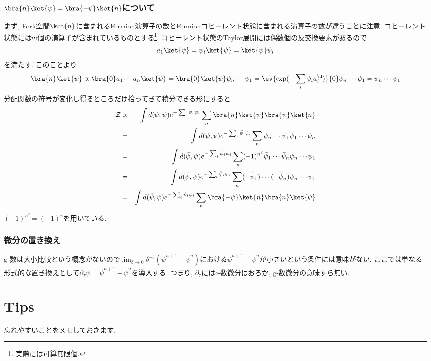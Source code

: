 \documentclass[10.5pt,a4paper]{jreport}
\begin{document}
\subsubsection{$\bra{n}\ket{\psi}=\bra{-\psi}\ket{n}$について}
まず, Fock空間$\ket{n}$に含まれるFermion演算子の数とFermionコヒーレント状態に含まれる演算子の数が違うことに注意. コヒーレント状態には$m$個の演算子が含まれているものとする\footnote{実際には可算無限個.}. コヒーレント状態のTaylor展開には偶数個の反交換要素があるので
\begin{eqnarray}
  a_1\ket{\psi} = \psi_i\ket{\psi} = \ket{\psi}\psi_i
\end{eqnarray}
を満たす. このことより
\begin{eqnarray}
  \bra{n}\ket{\psi} \varpropto \bra{0}a_1\cdots a_n\ket{\psi} = \bra{0}\ket{\psi}\psi_n\cdots\psi_1 = \ev{\exp(-\sum_i\psi_ia_i^\d)}{0}\psi_n\cdots\psi_1 = \psi_n\cdots\psi_1
\end{eqnarray}
分配関数の符号が変化し得るところだけ拾ってきて積分できる形にすると
\begin{eqnarray}
  {\cal Z} &\varpropto& \int d(\bar{\psi}, \psi)e^{-\sum_i\bar{\psi}_i\psi_i}\sum_n\bra{n}\ket{\psi}\bra{\psi}\ket{n}\\
  &=& \int d(\bar{\psi}, \psi)e^{-\sum_i\bar{\psi}_i\psi_i}\sum_n\psi_n\cdots\psi_1\bar{\psi}_1\cdots\bar{\psi}_n\\
  &=& \int d(\bar{\psi}, \psi)e^{-\sum_i\bar{\psi}_i\psi_i}\sum_n(-1)^{n^2}\bar{\psi}_1\cdots\bar{\psi}_n\psi_n\cdots\psi_1\\
  &=& \int d(\bar{\psi}, \psi)e^{-\sum_i\bar{\psi}_i\psi_i}\sum_n(-\bar{\psi}_1)\cdots(-\bar{\psi}_n)\psi_n\cdots\psi_1\\
  &=& \int d(\bar{\psi}, \psi)e^{-\sum_i\bar{\psi}_i\psi_i}\sum_n\bra{-\psi}\ket{n}\bra{n}\ket{\psi}
\end{eqnarray}
$(-1)^{n^2} = (-1)^n$を用いている.
\subsubsection{微分の置き換え}
g-数は大小比較という概念がないので$\lim_{\delta\rightarrow 0}\delta^{-1}(\bar{\psi}^{n+1} - \bar{\psi}^n)$における$\bar{\psi}^{n+1} - \bar{\psi}^n$が小さいという条件には意味がない. ここでは単なる形式的な置き換えとして$\partial_\tau\bar{\psi} = \bar{\psi}^{n+1} - \bar{\psi}^n$を導入する. つまり, $\partial_\tau$にはc-数微分はおろか, g-数微分の意味すら無い.

\section{Tips}
忘れやすいことをメモしておきます.
\end{document}
